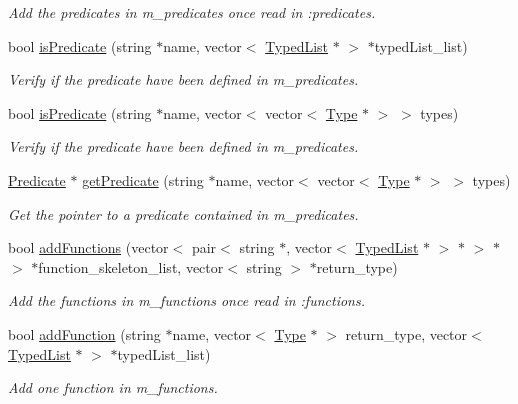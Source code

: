 \begin{DoxyCompactItemize}
\begin{DoxyCompactList}\small\item\em Add the predicates in m\+\_\+predicates once read in \+:predicates. \end{DoxyCompactList}\item 
bool \hyperlink{classData_a8b38b503a1026118a9dde08be92f609f}{is\+Predicate} (string $\ast$name, vector$<$ \hyperlink{classTypedList}{Typed\+List} $\ast$ $>$ $\ast$typed\+List\+\_\+list)
\begin{DoxyCompactList}\small\item\em Verify if the predicate have been defined in m\+\_\+predicates. \end{DoxyCompactList}\item 
bool \hyperlink{classData_a5b576ebad8f95406f9940e832b401d45}{is\+Predicate} (string $\ast$name, vector$<$ vector$<$ \hyperlink{classType}{Type} $\ast$ $>$ $>$ types)
\begin{DoxyCompactList}\small\item\em Verify if the predicate have been defined in m\+\_\+predicates. \end{DoxyCompactList}\item 
\hyperlink{classPredicate}{Predicate} $\ast$ \hyperlink{classData_a639f1aec2b6917247a9835907a638c52}{get\+Predicate} (string $\ast$name, vector$<$ vector$<$ \hyperlink{classType}{Type} $\ast$ $>$ $>$ types)
\begin{DoxyCompactList}\small\item\em Get the pointer to a predicate contained in m\+\_\+predicates. \end{DoxyCompactList}\item 
bool \hyperlink{classData_af1c23bcc960f630dd922a2b7536f3976}{add\+Functions} (vector$<$ pair$<$ string $\ast$, vector$<$ \hyperlink{classTypedList}{Typed\+List} $\ast$ $>$ $\ast$ $>$ $\ast$ $>$ $\ast$function\+\_\+skeleton\+\_\+list, vector$<$ string $>$ $\ast$return\+\_\+type)
\begin{DoxyCompactList}\small\item\em Add the functions in m\+\_\+functions once read in \+:functions. \end{DoxyCompactList}\item 
bool \hyperlink{classData_ab6d02279beb84726bb046dadf8190222}{add\+Function} (string $\ast$name, vector$<$ \hyperlink{classType}{Type} $\ast$ $>$ return\+\_\+type, vector$<$ \hyperlink{classTypedList}{Typed\+List} $\ast$ $>$ $\ast$typed\+List\+\_\+list)
\begin{DoxyCompactList}\small\item\em Add one function in m\+\_\+functions. \end{DoxyCompactList}\item 

\end{DoxyCompactItemize}
